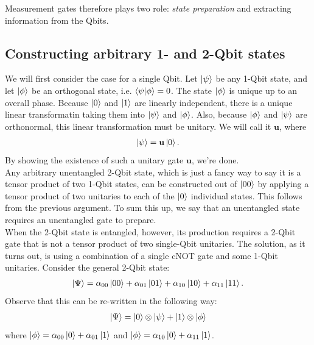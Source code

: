 \documentclass{book}
\theoremstyle{definition}
\begin{document}
Measurement gates therefore plays two role: \textit{state preparation} and extracting information from the Qbits. 


\subsection{Constructing arbitrary 1- and 2-Qbit states}

We will first consider the case for a single Qbit. Let $\ket{\psi}$ be any 1-Qbit state, and let $\ket{\phi}$ be an orthogonal state, i.e. $\braket{\psi}{\phi} = 0$. The state $\ket{\phi}$ is unique up to an overall phase. Because $\ket{0}$ and $\ket{1}$ are linearly independent, there is a unique linear transformatin taking them into $\ket{\psi}$ and $\ket{\phi}$. Also, because $\ket{\phi}$ and $\ket{\psi}$ are orthonormal, this linear transformation must be unitary. We will call it $\mathbf{u}$, where
\begin{align}
\ket{\psi} = \mathbf{u}\ket{0}.  
\end{align}
By showing the existence of such a unitary gate $\mathbf{u}$, we're done. \\

Any arbitrary unentangled 2-Qbit state, which is just a fancy way to say it is a tensor product of two 1-Qbit states, can be constructed out of $\ket{00}$ by applying a tensor product of two unitaries to each of the $\ket{0}$ individual states. This follows from the previous argument. To sum this up, we say that an unentangled state requires an unentangled gate to prepare. \\

When the 2-Qbit state is entangled, however, its production requires a 2-Qbit gate that is not a tensor product of two single-Qbit unitaries. The solution, as it turns out, is using a combination of a single cNOT gate and some 1-Qbit unitaries. Consider the general 2-Qbit state:
\begin{align}
\ket{\Psi} = \alpha_{00}\ket{00} + \alpha_{01}\ket{01} + \alpha_{10}\ket{10} + \alpha_{11}\ket{11}.
\end{align}
Observe that this can be re-written in the following way:
\begin{align}
\ket{\Psi} = \ket{0}\otimes \ket{\psi} + \ket{1}\otimes\ket{\phi}
\end{align}
where $\ket{\phi} = \alpha_{00}\ket{0} + \alpha_{01}\ket{1}$ and $\ket{\phi} = \alpha_{10}\ket{0} + \alpha_{11}\ket{1}$.  \\
\end{document}
